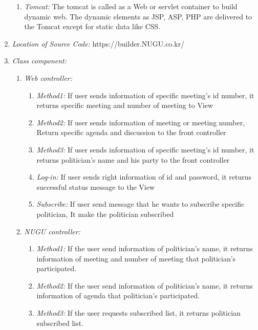 \documentclass[conference]{IEEEtran}
\begin{document}
\begin{enumerate}
\begin{enumerate}
	\item \textit {Tomcat: }The tomcat is called as a Web or servlet container to build dynamic web. The dynamic elements as JSP, ASP, PHP are delivered to the Tomcat except for static data like CSS.\
  	  \end{enumerate}

  \item \textit{Location of Source Code: } https://builder.NUGU.co.kr/\\

  \item \textit{Class component: } 
  	 \begin{enumerate}
	\item \textit {Web controller: }  \
	 \begin{enumerate}
	\item \textit {Method1: }  If user sends information of specific meeting’s id number, it returns specific meeting and number of meeting to View
	\item \textit {Method2: } If user sends information of meeting or meeting number, Return specific agenda and discussion to the front controller
	\item \textit {Method3: } If user sends information of specific meeting’s id number, it returns politician’s name and his party to the front controller
	\item \textit { Log-in:} If user sends right information of id and password, it returns successful status message to the View
	\item \textit { Subscribe:} If user send message that he wants to subscribe specific politician, It make the politician subscribed
	\\
	 \end{enumerate}

	\item \textit {NUGU controller: }  \

	 \begin{enumerate}
	\item \textit {Method1: }   If the user send information of politician’s name, it returns information of meeting and number of meeting that politician’s participated.
	\item \textit {Method2: } If the user send information of politician’s name, it returns information of agenda that politician’s participated.
	\item \textit {Method3: } If the user requests subscribed list, it returns politician subscribed list.
	\\
	  \end{enumerate}
	  

\end{enumerate}
\end{enumerate}
\end{document}
